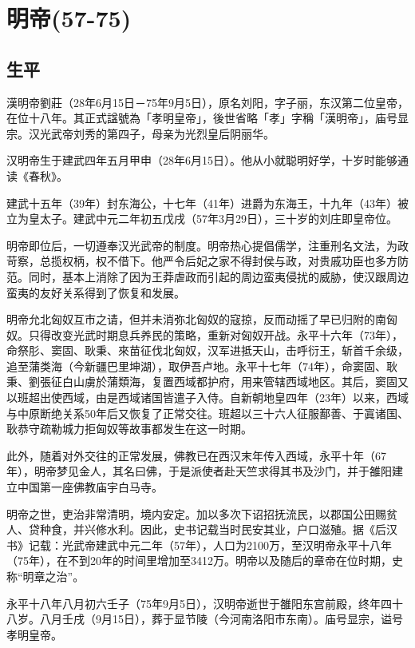 
\section{明帝\tiny(57-75)}

\subsection{生平}

漢明帝劉莊（28年6月15日－75年9月5日），原名刘阳，字子丽，东汉第二位皇帝，在位十八年。其正式諡號為「孝明皇帝」，後世省略「孝」字稱「漢明帝」，庙号显宗。汉光武帝刘秀的第四子，母亲为光烈皇后阴丽华。

汉明帝生于建武四年五月甲申（28年6月15日）。他从小就聪明好学，十岁时能够通读《春秋》。

建武十五年（39年）封东海公，十七年（41年）进爵为东海王，十九年（43年）被立为皇太子。建武中元二年初五戊戌（57年3月29日），三十岁的刘庄即皇帝位。

明帝即位后，一切遵奉汉光武帝的制度。明帝热心提倡儒学，注重刑名文法，为政苛察，总揽权柄，权不借下。他严令后妃之家不得封侯与政，对贵戚功臣也多方防范。同时，基本上消除了因为王莽虐政而引起的周边蛮夷侵扰的威胁，使汉跟周边蛮夷的友好关系得到了恢复和发展。

明帝允北匈奴互市之请，但并未消弥北匈奴的寇掠，反而动摇了早已归附的南匈奴。只得改变光武时期息兵养民的策略，重新对匈奴开战。永平十六年（73年），命祭肜、窦固、耿秉、來苗征伐北匈奴，汉军进抵天山，击呼衍王，斩首千余级，追至蒲类海（今新疆巴里坤湖），取伊吾卢地。永平十七年（74年），命窦固、耿秉、劉張征白山虜於蒲類海，复置西域都护府，用来管辖西域地区。其后，窦固又以班超出使西域，由是西域诸国皆遣子入侍。自新朝地皇四年（23年）以来，西域与中原断绝关系50年后又恢复了正常交往。班超以三十六人征服鄯善、于寘诸国、耿恭守疏勒城力拒匈奴等故事都发生在这一时期。

此外，随着对外交往的正常发展，佛教已在西汉末年传入西域，永平十年（67年），明帝梦见金人，其名曰佛，于是派使者赴天竺求得其书及沙门，并于雒阳建立中国第一座佛教庙宇白马寺。

明帝之世，吏治非常清明，境内安定。加以多次下诏招抚流民，以郡国公田赐贫人、贷种食，并兴修水利。因此，史书记载当时民安其业，户口滋殖。据《后汉书》记载：光武帝建武中元二年（57年），人口为2100万，至汉明帝永平十八年（75年），在不到20年的时间里增加至3412万。明帝以及随后的章帝在位时期，史称“明章之治”。

永平十八年八月初六壬子（75年9月5日），汉明帝逝世于雒阳东宫前殿，终年四十八岁。八月壬戌（9月15日），葬于显节陵（今河南洛阳市东南）。庙号显宗，谥号孝明皇帝。


